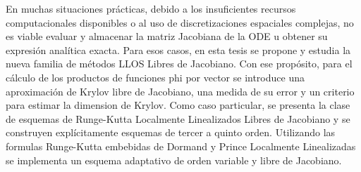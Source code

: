 En muchas situaciones prácticas, debido a los insuficientes recursos computacionales disponibles o al uso de discretizaciones espaciales complejas, no es viable evaluar y almacenar la matriz Jacobiana de la ODE u obtener su expresión analítica exacta. Para esos casos, en esta tesis se propone y estudia la nueva familia de métodos LLOS Libres de Jacobiano. Con ese propósito, para el cálculo de los productos de funciones phi por vector se introduce una aproximación de Krylov libre de Jacobiano, una medida de su error y un criterio para estimar la dimension de Krylov. Como caso particular, se presenta la clase de esquemas de Runge-Kutta Localmente Linealizados Libres de Jacobiano y se construyen explícitamente esquemas de tercer a quinto orden. Utilizando las  formulas Runge-Kutta embebidas de Dormand y Prince Localmente Linealizadas se implementa un esquema adaptativo de orden variable y libre de Jacobiano.


